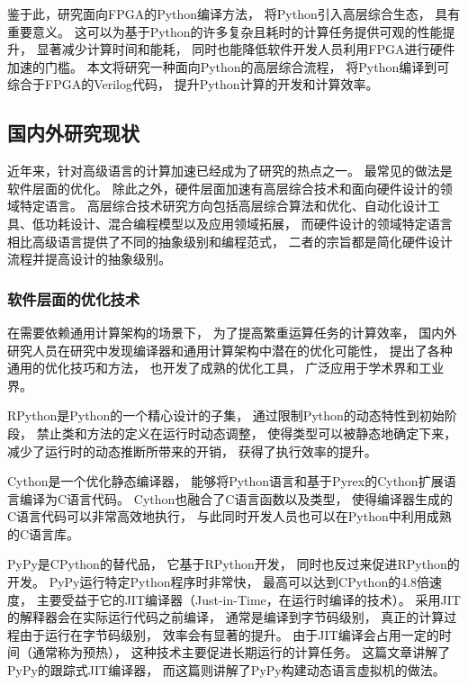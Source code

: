 鉴于此，研究面向FPGA的Python编译方法，
将Python引入高层综合生态，
具有重要意义。
这可以为基于Python的许多复杂且耗时的计算任务提供可观的性能提升，
显著减少计算时间和能耗，
同时也能降低软件开发人员利用FPGA进行硬件加速的门槛。
本文将研究一种面向Python的高层综合流程，
将Python编译到可综合于FPGA的Verilog代码，
提升Python计算的开发和计算效率。

\subsection{国内外研究现状}

近年来，针对高级语言的计算加速已经成为了研究的热点之一。
最常见的做法是软件层面的优化。
除此之外，硬件层面加速有高层综合技术和面向硬件设计的领域特定语言。
高层综合技术研究方向包括高层综合算法和优化、自动化设计工具、低功耗设计、混合编程模型以及应用领域拓展，
而硬件设计的领域特定语言相比高级语言提供了不同的抽象级别和编程范式，
二者的宗旨都是简化硬件设计流程并提高设计的抽象级别。

\subsubsection{软件层面的优化技术}

在需要依赖通用计算架构的场景下，
为了提高繁重运算任务的计算效率，
国内外研究人员在研究中发现编译器和通用计算架构中潜在的优化可能性，
提出了各种通用的优化技巧和方法，
也开发了成熟的优化工具，
广泛应用于学术界和工业界。

RPython\cite{rpython}是Python的一个精心设计的子集，
通过限制Python的动态特性到初始阶段，
禁止类和方法的定义在运行时动态调整，
使得类型可以被静态地确定下来，
减少了运行时的动态推断所带来的开销，
获得了执行效率的提升。

Cython\cite{cython}是一个优化静态编译器，
能够将Python语言和基于Pyrex的Cython扩展语言编译为C语言代码。
Cython也融合了C语言函数以及类型，
使得编译器生成的C语言代码可以非常高效地执行，
与此同时开发人员也可以在Python中利用成熟的C语言库。

PyPy\cite{pypy3}是CPython的替代品，
它基于RPython\cite{rpython}开发，
同时也反过来促进RPython的开发。
PyPy运行特定Python程序时非常快，
最高可以达到CPython的4.8倍速度，
主要受益于它的JIT编译器（Just-in-Time，在运行时编译的技术）\cite{jit}。
采用JIT的解释器会在实际运行代码之前编译，
通常是编译到字节码\cite{bytecode}级别，
真正的计算过程由于运行在字节码级别，
效率会有显著的提升。
由于JIT编译会占用一定的时间（通常称为预热），
这种技术主要促进长期运行的计算任务。
这篇文章\cite{pypy1}讲解了PyPy的跟踪式JIT编译器，
而这篇\cite{pypy2}则讲解了PyPy构建动态语言虚拟机的做法。

